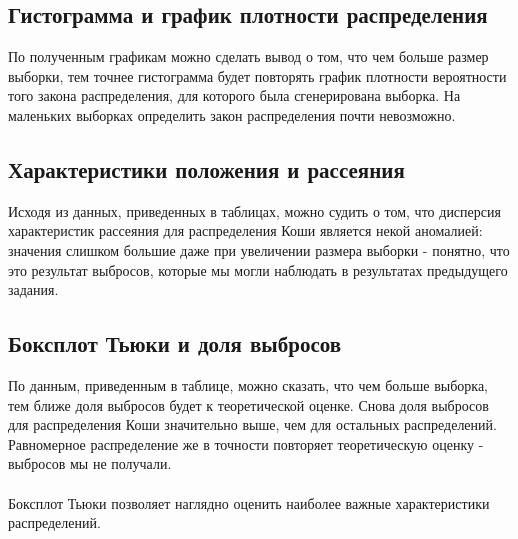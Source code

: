 \subsection{Гистограмма и график плотности распределения}
По полученным графикам можно сделать вывод о том, что чем больше размер выборки, тем точнее гистограмма будет повторять график плотности вероятности того закона распределения, для которого была сгенерирована выборка. На маленьких выборках определить закон распределения почти невозможно.

\subsection{Характеристики положения и рассеяния}
Исходя из данных, приведенных в таблицах, можно судить о том, что дисперсия характеристик рассеяния для распределения Коши является некой аномалией: значения слишком большие даже при увеличении размера выборки - понятно, что это результат выбросов, которые мы могли наблюдать в результатах предыдущего задания.

\subsection{Боксплот Тьюки и доля выбросов}
По данным, приведенным в таблице, можно сказать, что чем больше выборка, тем ближе доля выбросов будет к теоретической оценке. Снова доля выбросов для распределения Коши значительно выше, чем для остальных распределений. Равномерное распределение же в точности повторяет теоретическую оценку - выбросов мы не получали. \\
\\
Боксплот Тьюки позволяет наглядно оценить наиболее важные характеристики распределений.

